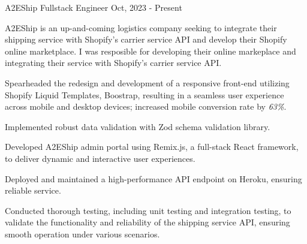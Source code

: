 \cventry
{A2EShip} %
{Fullstack Engineer} %
{ }
{Oct, 2023 - Present}
{
	A2EShip is an up-and-coming logistics company seeking to integrate their shipping service with Shopify's carrier service API and develop their Shopify online marketplace. I was resposible for developing their online markeplace and integrating their service with Shopify's carrier service API.
	\begin{cvitemsdesc} %
		\item {Spearheaded the redesign and development of a responsive front-end utilizing Shopify Liquid Templates, Boostrap, resulting in a seamless user experience across mobile and desktop devices; increased mobile conversion rate by \emph{63\%}.}
		\item {Implemented robust data validation with Zod schema validation library.}
		\item {Developed A2EShip admin portal using Remix.js, a full-stack React framework, to deliver dynamic and interactive user experiences.}
		\item {Deployed and maintained a high-performance API endpoint on Heroku, ensuring reliable service.}
		\item {Conducted thorough testing, including unit testing and integration testing, to validate the functionality and reliability of the shipping service API, ensuring smooth operation under various scenarios.}
    \item { }
	\end{cvitemsdesc}
}
